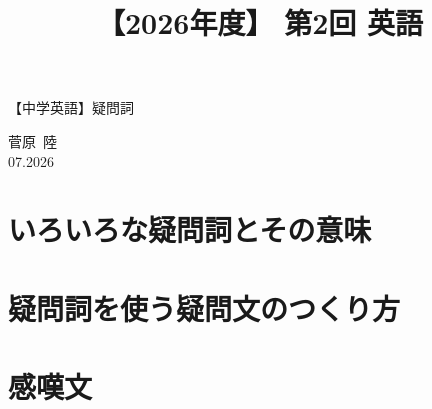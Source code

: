 \documentclass[12pt,a4paper]{jsarticle}
\title{【2026年度】 第2回 英語}                %
\author{}                     %
\date{}                       %
\begin{document}
\begin{center}
{\LARGE 【中学英語】疑問詞}
\end{center}

\vspace{5mm}
\begin{flushright}
  菅原\ 陸\\[1.2em]
  07.2026
\end{flushright}


\section{いろいろな疑問詞とその意味}



\section{疑問詞を使う疑問文のつくり方}



\section{感嘆文}


\end{document}
